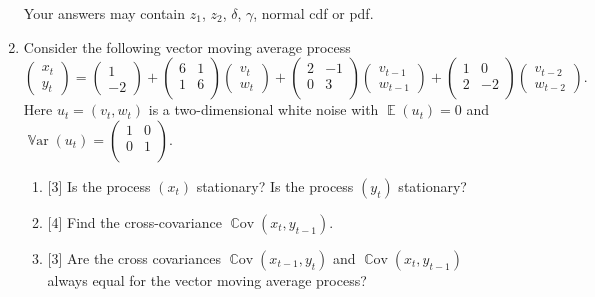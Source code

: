 \documentclass[12pt]{article}
\DeclareMathOperator{\Cov}{\mathbb{C}ov}
\DeclareMathOperator{\Var}{\mathbb{V}ar}
\DeclareMathOperator{\E}{\mathbb{E}}
\begin{document}
\begin{enumerate}
Your answers may contain $z_1$, $z_2$, $\delta$, $\gamma$, normal cdf or pdf. 


    \item Consider the following vector moving average process
    \[
    \begin{pmatrix}
        x_t \\
        y_t 
    \end{pmatrix} =
    \begin{pmatrix}
        1 \\
        -2
    \end{pmatrix} + 
    \begin{pmatrix}
        6 & 1 \\
        1 & 6 \\
    \end{pmatrix}
    \begin{pmatrix}
        v_t \\
        w_t
    \end{pmatrix} +
    \begin{pmatrix}
        2 & -1 \\
        0 & 3 \\
    \end{pmatrix}
    \begin{pmatrix}
        v_{t-1} \\
        w_{t-1}
    \end{pmatrix} +
    \begin{pmatrix}
        1 & 0 \\
        2 & -2 \\
    \end{pmatrix}
    \begin{pmatrix}
        v_{t-2} \\
        w_{t-2}
    \end{pmatrix}.
    \]
    Here $u_t = (v_t, w_t)$ is a two-dimensional white noise with $\E(u_t)=0$ and $\Var(u_t) = \begin{pmatrix}
        1 & 0 \\
        0 & 1 \\
    \end{pmatrix}$.

    \begin{enumerate}
        \item {[3]} Is the process $(x_t)$ stationary? Is the process $(y_t)$ stationary?
        \item {[4]} Find the cross-covariance $\Cov(x_t, y_{t-1})$. 
        \item {[3]} Are the cross covariances $\Cov(x_{t-1}, y_t)$ and $\Cov(x_t, y_{t-1})$ always equal for the vector moving average process?
    \end{enumerate}
    

\end{enumerate}
\end{document}

